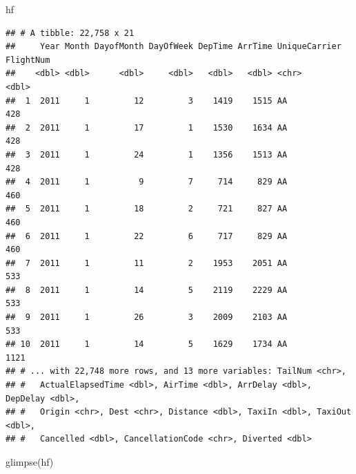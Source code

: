 \documentclass[
]{book}
\newenvironment{Shaded}{\begin{snugshade}}{\end{snugshade}}
\newcommand{\FunctionTok}[1]{\textcolor[rgb]{0.00,0.00,0.00}{#1}}
\newcommand{\NormalTok}[1]{#1}
\begin{document}
\begin{Shaded}
\begin{Highlighting}[]
\NormalTok{hf}
\end{Highlighting}
\end{Shaded}

\begin{verbatim}
## # A tibble: 22,758 x 21
##     Year Month DayofMonth DayOfWeek DepTime ArrTime UniqueCarrier FlightNum
##    <dbl> <dbl>      <dbl>     <dbl>   <dbl>   <dbl> <chr>             <dbl>
##  1  2011     1         12         3    1419    1515 AA                  428
##  2  2011     1         17         1    1530    1634 AA                  428
##  3  2011     1         24         1    1356    1513 AA                  428
##  4  2011     1          9         7     714     829 AA                  460
##  5  2011     1         18         2     721     827 AA                  460
##  6  2011     1         22         6     717     829 AA                  460
##  7  2011     1         11         2    1953    2051 AA                  533
##  8  2011     1         14         5    2119    2229 AA                  533
##  9  2011     1         26         3    2009    2103 AA                  533
## 10  2011     1         14         5    1629    1734 AA                 1121
## # ... with 22,748 more rows, and 13 more variables: TailNum <chr>,
## #   ActualElapsedTime <dbl>, AirTime <dbl>, ArrDelay <dbl>, DepDelay <dbl>,
## #   Origin <chr>, Dest <chr>, Distance <dbl>, TaxiIn <dbl>, TaxiOut <dbl>,
## #   Cancelled <dbl>, CancellationCode <chr>, Diverted <dbl>
\end{verbatim}

\begin{Shaded}
\begin{Highlighting}[]
\FunctionTok{glimpse}\NormalTok{(hf)}
\end{Highlighting}
\end{Shaded}
\end{document}

